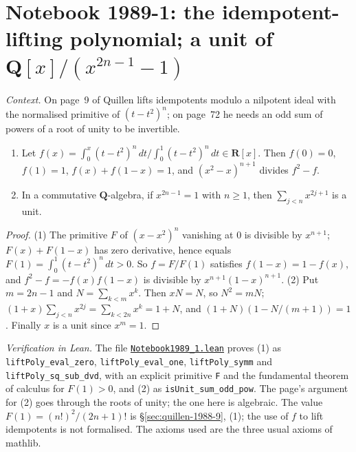 \section[Notebook 1989-1: the idempotent-lifting polynomial]{Notebook 1989-1: the idempotent-lifting polynomial; a unit of $\mathbf Q[x]/(x^{2n-1} - 1)$\protect{}}\label{sec:quillen-1989-1}

\emph{Context.} On page~9 of  Quillen lifts idempotents modulo a nilpotent ideal with the normalised primitive of $(t - t^2)^n$; on page~72 he needs an odd sum of powers of a root of unity to be invertible.

\begin{encadre}
\begin{theoreme}\label{thm:quillen-1989-1}\leavevmode
\begin{enumerate}
\item Let $f(x) = \int_0^x(t - t^2)^n\,dt\big/\int_0^1(t - t^2)^n\,dt \in \mathbf R[x]$. Then $f(0) = 0$, $f(1) = 1$, $f(x) + f(1 - x) = 1$, and $(x^2 - x)^{n+1}$ divides $f^2 - f$.
\item In a commutative $\mathbf Q$-algebra, if $x^{2n-1} = 1$ with $n \ge 1$, then $\sum_{j<n}x^{2j+1}$ is a unit.
\end{enumerate}
\end{theoreme}
\end{encadre}

\begin{proof}
(1) The primitive $F$ of $(x - x^2)^n$ vanishing at $0$ is divisible by $x^{n+1}$; $F(x) + F(1 - x)$ has zero derivative, hence equals $F(1) = \int_0^1(t - t^2)^n\,dt > 0$. So $f = F/F(1)$ satisfies $f(1 - x) = 1 - f(x)$, and $f^2 - f = -f(x)f(1 - x)$ is divisible by $x^{n+1}(1 - x)^{n+1}$. (2) Put $m = 2n - 1$ and $N = \sum_{k<m}x^k$. Then $xN = N$, so $N^2 = mN$; $(1 + x)\sum_{j<n}x^{2j} = \sum_{k<2n}x^k = 1 + N$, and $(1 + N)(1 - N/(m + 1)) = 1$. Finally $x$ is a unit since $x^m = 1$.
\end{proof}

\emph{Verification in Lean.} The file \href{\leanblobmain/Notebook1989_1.lean}{\texttt{Notebook1989\_1.\allowbreak{}lean}} proves (1) as \texttt{liftPoly\_eval\_zero}, \texttt{liftPoly\_eval\_one}, \texttt{liftPoly\_symm} and \texttt{liftPoly\_sq\_sub\_dvd}, with an explicit primitive \texttt{F} and the fundamental theorem of calculus for $F(1) > 0$, and (2) as \texttt{isUnit\_sum\_odd\_pow}. The page's argument for (2) goes through the roots of unity; the one here is algebraic. The value $F(1) = (n!)^2/(2n + 1)!$ is \S\ref{sec:quillen-1988-9}, (1); the use of $f$ to lift idempotents is not formalised. The axioms used are the three usual axioms of mathlib.


